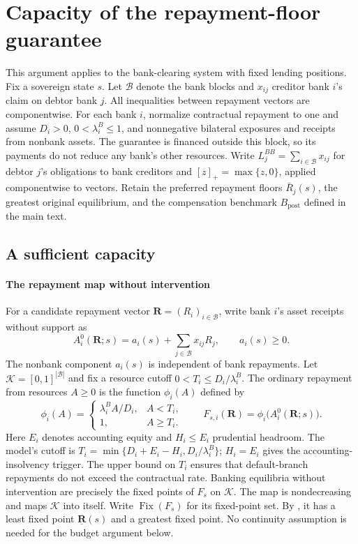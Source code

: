 \section{Capacity of the repayment-floor guarantee}
\label{app:repayment-floor-budget}

This argument applies to the bank-clearing system with fixed lending positions. Fix a sovereign
state $s$. Let $\mathcal B$ denote the bank blocks and $x_{ij}$ creditor bank $i$'s claim on debtor bank $j$. All inequalities between repayment vectors are componentwise.
For each bank $i$, normalize contractual repayment to one and assume $D_i>0$, $0<\lambda_i^B\leq1$, and nonnegative
bilateral exposures and receipts from nonbank assets. The guarantee is
financed outside this block, so its payments do not reduce any bank's other
resources. Write $L_j^{BB}=\sum_{i\in\mathcal B}x_{ij}$ for debtor $j$'s obligations to bank creditors and $[z]_+=\max\{z,0\}$, applied componentwise to vectors. Retain the preferred repayment floors $\bar R_j(s)$, the greatest original equilibrium, and the compensation benchmark $B_{\mathrm{post}}$ defined in the main text.

\subsection{A sufficient capacity}
\paragraph{The repayment map without intervention}
For a candidate repayment vector $\mathbf{R}=(R_i)_{i\in\mathcal B}$, write bank $i$'s asset receipts without support as
\[
 A_i^0(\mathbf{R};s)=a_i(s)+\sum_{j\in\mathcal B}x_{ij}R_j,
 \qquad a_i(s)\geq0.
\]
The nonbank component $a_i(s)$ is independent of bank repayments. Let $\mathcal K=[0,1]^{|\mathcal B|}$ and fix a resource cutoff $0<T_i\leq D_i/\lambda_i^B$. The ordinary repayment from resources $A\geq0$ is the function $\phi_i(A)$ defined by
\[
 \phi_i(A)=
 \begin{cases}
 \lambda_i^B A/D_i,& A<T_i,\\
 1,& A\geq T_i.
 \end{cases}
 \qquad
 F_{s,i}(\mathbf{R})=\phi_i\bigl(A_i^0(\mathbf{R};s)\bigr).
\]
Here $E_i$ denotes accounting equity and $H_i\leq E_i$ prudential headroom. The model's cutoff is $T_i=\min\{D_i+E_i-H_i,D_i/\lambda_i^B\}$; $H_i=E_i$ gives the accounting-insolvency trigger. The upper bound on $T_i$ ensures that default-branch repayments do not exceed the contractual rate. Banking equilibria without intervention are precisely the fixed points of
$F_s$ on $\mathcal K$. The map is nondecreasing and maps $\mathcal K$ into
itself. Write $\operatorname{Fix}(F_s)$ for its fixed-point set. By \citet{Tarski1955}, it has a least fixed point $\underline{\mathbf{R}}(s)$ and a greatest fixed point. No continuity assumption is needed for the budget argument below.


